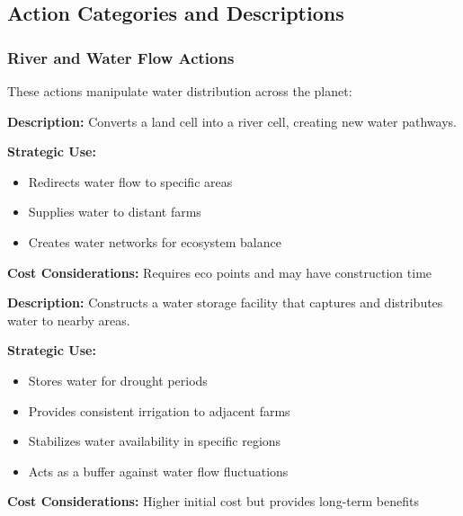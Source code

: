 \documentclass[12pt,a4paper]{article}
\begin{document}
\subsection{Action Categories and Descriptions}

\subsubsection{River and Water Flow Actions}

These actions manipulate water distribution across the planet:

\begin{tcolorbox}[colback=blue!5,colframe=blue!50!black,title=Build Canal]
\textbf{Description:} Converts a land cell into a river cell, creating new water pathways.

\textbf{Strategic Use:}
\begin{itemize}
    \item Redirects water flow to specific areas
    \item Supplies water to distant farms
    \item Creates water networks for ecosystem balance
\end{itemize}

\textbf{Cost Considerations:} Requires eco points and may have construction time
\end{tcolorbox}

\begin{tcolorbox}[colback=blue!5,colframe=blue!50!black,title=Place Reservoir]
\textbf{Description:} Constructs a water storage facility that captures and distributes water to nearby areas.

\textbf{Strategic Use:}
\begin{itemize}
    \item Stores water for drought periods
    \item Provides consistent irrigation to adjacent farms
    \item Stabilizes water availability in specific regions
    \item Acts as a buffer against water flow fluctuations
\end{itemize}

\textbf{Cost Considerations:} Higher initial cost but provides long-term benefits
\end{tcolorbox}
\end{document}
